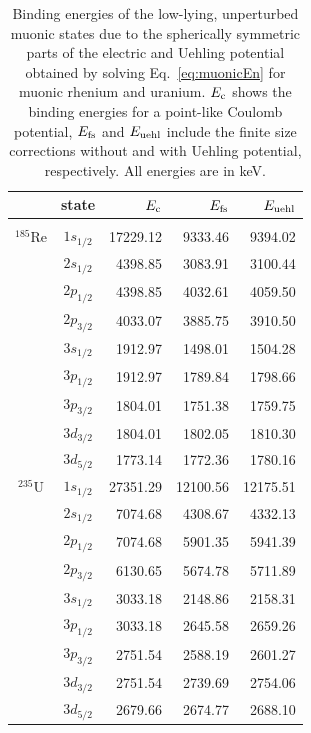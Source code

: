\begin{table}[b]
\caption{\label{tab:monopole}%
Binding energies of the low-lying, unperturbed muonic states due to the spherically symmetric parts of the electric and Uehling potential obtained by solving Eq.~\eqref{eq:muonicEn} for muonic rhenium and uranium. $E_{\rm{c}}$ shows the binding energies for a point-like Coulomb potential, $E_{\rm{fs}}$ and $E_{\rm{uehl}}$ include the finite size corrections without and with Uehling potential, respectively. All energies are in keV.
}
\centering
\begin{tabular}{c|crrr}
& state & $E_{\rm{c}}$& $E_{\rm{fs}}$ &$E_{\rm{uehl}}$\\ \hline \\[-7pt]
$^{185}$Re & $1s_{1/2}$ & 17229.12 & 9333.46 & 9394.02 \\
& $2s_{1/2}$ & 4398.85 & 3083.91 & 3100.44 \\
& $2p_{1/2}$ & 4398.85 & 4032.61 & 4059.50 \\
& $2p_{3/2}$ & 4033.07 & 3885.75 & 3910.50 \\
& $3s_{1/2}$ & 1912.97 & 1498.01 & 1504.28 \\
& $3p_{1/2}$ & 1912.97 & 1789.84 & 1798.66 \\
& $3p_{3/2}$ & 1804.01 & 1751.38 & 1759.75 \\
& $3d_{3/2}$ & 1804.01 & 1802.05 & 1810.30 \\
& $3d_{5/2}$ & 1773.14 & 1772.36 & 1780.16 \\[7pt]
$^{235}$U&$1s_{1/2}$ & 27351.29 & 12100.56 & 12175.51 \\
& $2s_{1/2}$ & 7074.68 & 4308.67 & 4332.13 \\
& $2p_{1/2}$ & 7074.68 & 5901.35 & 5941.39 \\
& $2p_{3/2}$ & 6130.65 & 5674.78 & 5711.89 \\
& $3s_{1/2}$ & 3033.18 & 2148.86 & 2158.31 \\
& $3p_{1/2}$ & 3033.18 & 2645.58 & 2659.26 \\
& $3p_{3/2}$ & 2751.54 & 2588.19 & 2601.27 \\
& $3d_{3/2}$ & 2751.54 & 2739.69 & 2754.06 \\
& $3d_{5/2}$ & 2679.66 & 2674.77 & 2688.10

\end{tabular}
\end{table}
%
